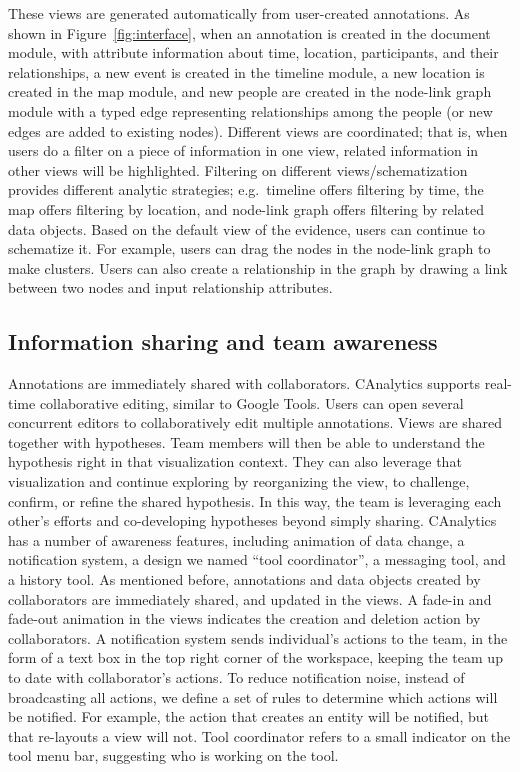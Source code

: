 These views are generated automatically from user-created annotations. As shown in Figure~\ref{fig:interface}, when an annotation is created in the
document module, with attribute information about time, location, participants, and their
relationships, a new event is created in the timeline module, a new location is
created in the map module, and new people are created in the node-link graph
module with a typed edge representing relationships among the people (or new
edges are added to existing nodes). Different views are coordinated; that is,
when users do a filter on a piece of information in one view, related
information in other views will be highlighted. Filtering on different
views/schematization provides different analytic strategies; e.g. timeline
offers filtering by time, the map offers filtering by location, and node-link graph
offers filtering by related data objects. Based on the default view of the evidence,
users can continue to schematize it. For example, users can drag the nodes in
the node-link graph to make clusters. Users can also create a relationship in
the graph by drawing a link between two nodes and input relationship attributes.


\subsection{Information sharing and team awareness}

Annotations are immediately shared with collaborators. CAnalytics supports
real-time collaborative editing, similar to Google Tools. Users can open
several concurrent editors to collaboratively edit multiple annotations. Views
are shared together with hypotheses. Team members will then be able to
understand the hypothesis right in that visualization context. They can also
leverage that visualization and continue exploring by reorganizing the view, to
challenge, confirm, or refine the shared hypothesis. In this way, the team is
leveraging each other’s efforts and co-developing hypotheses beyond simply
sharing. CAnalytics has a number of awareness features, including animation of
data change, a notification system, a design we named “tool coordinator”, a
messaging tool, and a history tool. As mentioned before, annotations and data
objects created by collaborators are immediately shared, and updated in the
views. A fade-in and fade-out  animation in the views indicates the creation
and deletion action by collaborators. A notification system sends individual’s
actions to the team, in the form of a text box in the top right corner of the
workspace, keeping the team up to date with collaborator’s actions. To reduce
notification noise, instead of broadcasting all actions, we define a set of
rules to determine which actions will be notified. For example, the action that
creates an entity will be notified, but that re-layouts a view will not. Tool
coordinator refers to a small indicator on the tool menu bar, suggesting who is
working on the tool.

